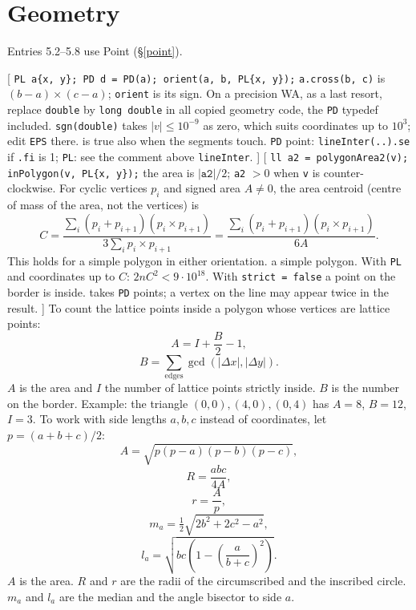 \section{Geometry}
\twolevels
{\footnotesize\tightdisplay Entries 5.2--5.8 use Point (\S\ref{point}).}

[
	 \texttt{PL a\{x, y\}; PD d = PD(a); orient(a, b, PL\{x, y\});}
	 \texttt{a.cross(b, c)} is $(b - a) \times (c - a)$; \texttt{orient} is its sign.
	 On a precision WA, as a last resort, replace \texttt{double} by \texttt{long double} in all copied geometry code, the \texttt{PD} typedef included.
	 \texttt{sgn(double)} takes $|v| \le 10^{-9}$ as zero, which suits coordinates up to $10^3$; edit \texttt{EPS} there.
	 is true also when the segments touch. \texttt{PD} point: \texttt{lineInter(..).se} if \texttt{.fi} is 1; \texttt{PL}: see the comment above \texttt{lineInter}.
]\label{point}
[
	 \texttt{ll a2 = polygonArea2(v); inPolygon(v, PL\{x, y\});}
	 the area is $|\texttt{a2}| / 2$; \texttt{a2} $> 0$ when \texttt{v} is counter-clockwise.
	For cyclic vertices $p_i$ and signed area $A \ne 0$, the area centroid (centre of mass of the area, not the vertices) is
	\[
		C = \frac{\sum_i (p_i + p_{i+1}) (p_i \times p_{i+1})}{3 \sum_i p_i \times p_{i+1}}
		= \frac{\sum_i (p_i + p_{i+1}) (p_i \times p_{i+1})}{6A}.
	\]
	This holds for a simple polygon in either orientation.
	 a simple polygon. With \texttt{PL} and coordinates up to $C$: $2nC^2 < 9 \cdot 10^{18}$.
	 With \texttt{strict = false} a point on the border is inside.
	 takes \texttt{PD} points; a vertex on the line may appear twice in the result.
]\label{polygon}
{\footnotesize\tightdisplay
{}
To count the lattice points inside a polygon whose vertices are lattice points:
\[ A = I + \frac{B}{2} - 1, \]
\[ B = \sum_{\text{edges}} \gcd(|\Delta x|, |\Delta y|). \]
$A$ is the area and $I$ the number of lattice points strictly inside. $B$ is the number on the border.
Example: the triangle $(0, 0), (4, 0), (0, 4)$ has $A = 8$, $B = 12$, $I = 3$.
To work with side lengths $a, b, c$ instead of coordinates, let $p = (a + b + c) / 2$:
\[ A = \sqrt{p(p - a)(p - b)(p - c)}, \]
\[ R = \frac{abc}{4A}, \]
\[ r = \frac{A}{p}, \]
\[ m_a = \tfrac{1}{2} \sqrt{2b^2 + 2c^2 - a^2}, \]
\[ l_a = \sqrt{bc \left(1 - \left(\frac{a}{b + c}\right)^2\right)}. \]
$A$ is the area. $R$ and $r$ are the radii of the circumscribed and the inscribed circle. $m_a$ and $l_a$ are the median and the angle bisector to side $a$.
}

